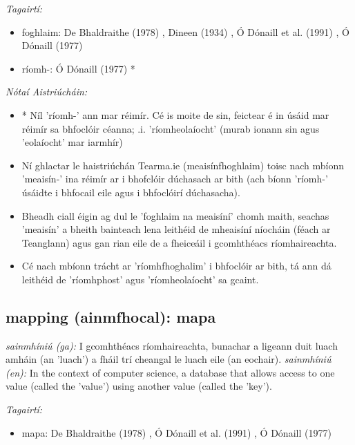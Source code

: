 \documentclass{article}
\begin{document}
 \noindent \textit{Tagairtí:}
\begin{itemize}
	\item foghlaim: De Bhaldraithe (1978) \cite{de-bhaldraithe}, Dineen (1934) \cite{dineen}, Ó Dónaill et al. (1991) \cite{focloir-beag}, Ó Dónaill (1977) \cite{odonaill}
	\item ríomh-: Ó Dónaill (1977) \cite{odonaill}*
\end{itemize}

 \noindent \textit{Nótaí Aistriúcháin:}
\begin{itemize}
	\item * Níl 'ríomh-' ann mar réimír. Cé is moite de sin, feictear é in úsáid mar réimír sa bhfoclóir céanna; .i. 'ríomheolaíocht' (murab ionann sin agus 'eolaíocht' mar iarmhír)
	\item Ní ghlactar le haistriúchán Tearma.ie (meaisínfhoghlaim) toisc nach mbíonn 'meaisín-' ina réimír ar i bhofclóir dúchasach ar bith (ach bíonn 'ríomh-' úsáidte i bhfocail eile agus i bhfoclóirí dúchasacha).
	\item Bheadh ciall éigin ag dul le 'foghlaim na meaisíní' chomh maith, seachas 'meaisín' a bheith bainteach lena leithéid de mheaisíní níocháin (féach ar Teanglann) agus gan rian eile de a fheiceáil i gcomhthéacs ríomhaireachta.
	\item Cé nach mbíonn trácht ar 'ríomhfhoghalim' i bhfoclóir ar bith, tá ann dá leithéid de 'ríomhphost' agus 'ríomheolaíocht' sa gcaint.
\end{itemize}


\subsection*{mapping (ainmfhocal): mapa} 
 \noindent \textit{sainmhíniú (ga):} I gcomhthéacs ríomhaireachta, bunachar a ligeann duit luach amháin (an 'luach') a fháil trí cheangal le luach eile (an eochair).
\newline\newline
 \noindent \textit{sainmhíniú (en):} In the context of computer science, a database that allows access to one value (called the 'value') using another value (called the 'key').
\newline

 \noindent \textit{Tagairtí:}
\begin{itemize}
	\item mapa: De Bhaldraithe (1978) \cite{de-bhaldraithe}, Ó Dónaill et al. (1991) \cite{focloir-beag}, Ó Dónaill (1977) \cite{odonaill}
\end{itemize}
\end{document}
